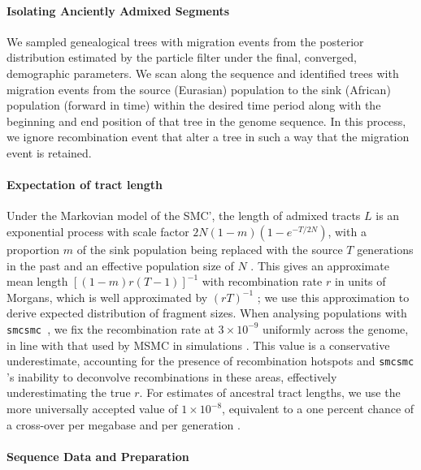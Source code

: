 \documentclass{article}
\newcommand{\SMC}{{\tt smcsmc }}
\begin{document}
\paragraph{Isolating Anciently Admixed Segments} We sampled genealogical trees with migration events from the posterior distribution estimated by the particle filter under the final, converged, demographic parameters. We scan along the sequence and identified trees with migration events from the source (Eurasian) population to the sink (African) population (forward in time) within the desired time period along with the beginning and end position of that tree in the genome sequence. In this process, we ignore recombination event that alter a tree in such a way that the migration event is retained.  

 
\paragraph{Expectation of tract length} Under the Markovian model of the SMC', the length of admixed tracts $L$ is an exponential process with scale factor $2N (1 - m ) \left( 1 - e^{-T / 2N} \right)$, with a proportion $m$ of the sink population being replaced with the source $T$ generations in the past and an effective population size of $N$ \cite{Marjoram2006,Liang953}. This gives an approximate mean length $\left[ (1 -m)r(T-1) \right]^{-1}$ with recombination rate $r$ in units of Morgans, which is well approximated
by  $(rT)^{-1}$ \cite{Racimo2015}; we use this approximation to derive expected distribution of fragment sizes. When analysing populations with \SMC, we fix the recombination rate at $3 \times 10^{-9}$ uniformly across the genome, in line with that used by MSMC in simulations \cite[Supp.\ section 7]{Schiffels2014a}.
This value is a conservative underestimate, accounting for the presence of recombination hotspots and \SMC's inability to deconvolve recombinations in these areas, effectively underestimating the true $r$.  For estimates of ancestral tract lengths, we use the more universally accepted value of $1 \times 10^{-8}$, equivalent to a one percent chance of a cross-over per megabase and per generation \cite{Dumont2008}. 

\paragraph{Sequence Data and Preparation}
\end{document}
